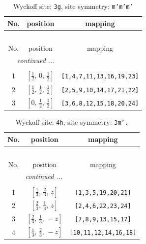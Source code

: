 \documentclass[fleqn,8pt]{jsarticle}
\begin{document}
\begin{longtable}{ccc}
\caption{Wyckoff site: {\tt 3g}, site symmetry: {\tt m'm'm'}}
 \\
 \hline \hline
No. & position & mapping \\ \hline \endfirsthead

\multicolumn{2}{l}{\tablename\ \thetable{}} \\
 \hline \hline
No. & position & mapping \\ \hline \endhead

 \hline \hline
\multicolumn{2}{r}{\footnotesize\it continued ...} \\ \endfoot

 \hline \hline
\multicolumn{2}{r}{} \\ \endlastfoot

1 & $\left[ \frac{1}{2},\, 0,\, \frac{1}{2} \right]$ & {\tt [1,4,7,11,13,16,19,23]} \\ \hline
2 & $\left[ \frac{1}{2},\, \frac{1}{2},\, \frac{1}{2} \right]$ & {\tt [2,5,9,10,14,17,21,22]} \\ \hline
3 & $\left[ 0,\, \frac{1}{2},\, \frac{1}{2} \right]$ & {\tt [3,6,8,12,15,18,20,24]} \\
\end{longtable}
\renewcommand{\arraystretch}{1.2}
\begin{longtable}{ccc}
\caption{Wyckoff site: {\tt 4h}, site symmetry: {\tt 3m'.}}
 \\
 \hline \hline
No. & position & mapping \\ \hline \endfirsthead

\multicolumn{2}{l}{\tablename\ \thetable{}} \\
 \hline \hline
No. & position & mapping \\ \hline \endhead

 \hline \hline
\multicolumn{2}{r}{\footnotesize\it continued ...} \\ \endfoot

 \hline \hline
\multicolumn{2}{r}{} \\ \endlastfoot

1 & $\left[ \frac{1}{3},\, \frac{2}{3},\, z \right]$ & {\tt [1,3,5,19,20,21]} \\ \hline
2 & $\left[ \frac{2}{3},\, \frac{1}{3},\, z \right]$ & {\tt [2,4,6,22,23,24]} \\ \hline
3 & $\left[ \frac{2}{3},\, \frac{1}{3},\, - z \right]$ & {\tt [7,8,9,13,15,17]} \\ \hline
4 & $\left[ \frac{1}{3},\, \frac{2}{3},\, - z \right]$ & {\tt [10,11,12,14,16,18]} \\
\end{longtable}
\end{document}
